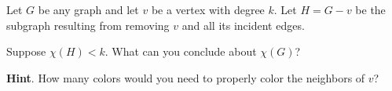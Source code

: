\documentclass{book}
\begin{document}
\setcounter{cpjt}{44}
\addtocounter{cpjt}{-1}
\begin{activity}\label{activity-37}
\hypertarget{p-385}{}%
Let \(G\) be any graph and let \(v\) be a vertex with degree \(k\).  Let \(H = G - v\) be the subgraph resulting from removing \(v\) and all its incident edges.%
\par
\hypertarget{p-386}{}%
Suppose \(\chi(H) \lt k\).  What can you conclude about \(\chi(G)\)?%
\par\smallskip%
\noindent\textbf{Hint}.\hypertarget{hint-18}{}\quad%
\hypertarget{p-387}{}%
How many colors would you need to properly color the neighbors of \(v\)?%
\end{activity}

\clearpage
\end{document}

